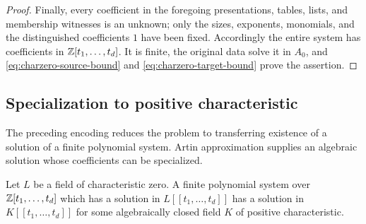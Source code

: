\begin{proof}
Finally, every coefficient in the foregoing presentations, tables,
lists, and membership witnesses is an unknown; only the sizes,
exponents, monomials, and the distinguished coefficients $1$ have
been fixed.  Accordingly the entire system has coefficients in
$\mathbb Z[t_1,\ldots,t_d]$.  It is finite, the original data solve it in
$A_0$, and \eqref{eq:charzero-source-bound} and
\eqref{eq:charzero-target-bound} prove the assertion.
\end{proof}

\subsection{Specialization to positive characteristic}

The preceding encoding reduces the problem to transferring existence
of a solution of a finite polynomial system. Artin approximation supplies
an algebraic solution whose coefficients can be specialized.

\begin{lemma}\label{lem:charzero-specialization}
Let $L$ be a field of characteristic zero.  A finite polynomial system
over $\mathbb Z[t_1,\ldots,t_d]$ which has a solution in $L[[t_1,\ldots,t_d]]$
has a solution in $K[[t_1,\ldots,t_d]]$ for some algebraically closed
field $K$ of positive characteristic.
\end{lemma}

